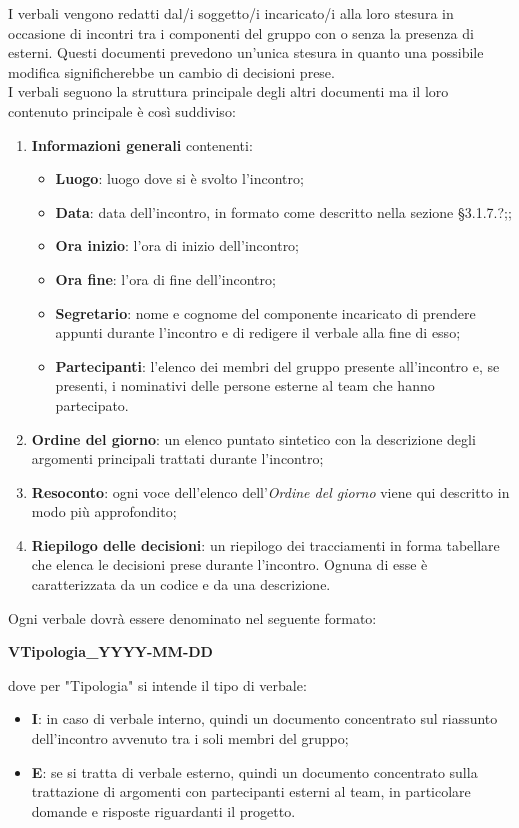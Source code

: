 	
	I verbali vengono redatti dal/i soggetto/i incaricato/i alla loro stesura in occasione di incontri tra i componenti del gruppo con o senza la presenza di esterni.  Questi documenti prevedono un'unica stesura in quanto una possibile modifica significherebbe un cambio di decisioni prese. \\
	I verbali seguono la struttura principale degli altri documenti ma il loro contenuto principale è così suddiviso:
	\begin{enumerate}
		\item \textbf{Informazioni generali} contenenti:
		\begin{itemize}
			\item \textbf{Luogo}: luogo dove si è svolto l'incontro;
			\item \textbf{Data}: data dell'incontro, in formato come descritto nella sezione §3.1.7.?;;
			\item \textbf{Ora inizio}: l'ora di inizio dell'incontro;
			\item \textbf{Ora fine}: l'ora di fine dell'incontro;
			\item \textbf{Segretario}: nome e cognome del componente incaricato di prendere appunti durante l'incontro e di redigere il verbale alla fine di esso;
			\item \textbf{Partecipanti}: l'elenco dei membri del gruppo presente all'incontro e, se presenti, i nominativi delle persone esterne al team che hanno partecipato.
		\end{itemize}
		\item \textbf{Ordine del giorno}: un elenco puntato sintetico con la descrizione degli argomenti principali trattati durante l'incontro;
		\item \textbf{Resoconto}: ogni voce dell'elenco dell'\textit{Ordine del giorno} viene qui descritto in modo più approfondito;
		\item \textbf{Riepilogo delle decisioni}: un riepilogo dei tracciamenti in forma tabellare che elenca le decisioni prese durante l'incontro. Ognuna di esse è caratterizzata da un codice e da una descrizione.
	\end{enumerate}
	Ogni verbale dovrà essere denominato nel seguente formato:
	\begin{center}
	\textbf{VTipologia\_YYYY-MM-DD}
	\end{center}
	dove per "Tipologia" si intende il tipo di verbale:
	\begin{itemize}
		\item \textbf{I}: in caso di verbale interno, quindi un documento concentrato sul riassunto dell'incontro avvenuto tra i soli membri del gruppo;
		\item \textbf{E}: se si tratta di verbale esterno, quindi un documento concentrato sulla trattazione di argomenti con partecipanti esterni al team, in particolare domande e risposte riguardanti il progetto.
	\end{itemize}		
